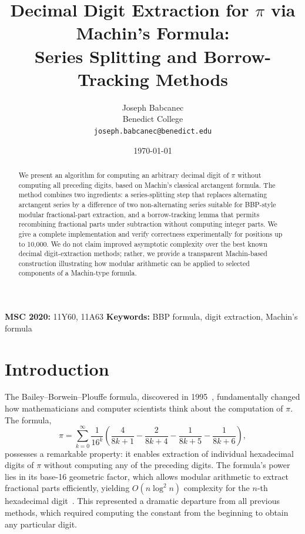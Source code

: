 \documentclass[11pt]{article}
\title{Decimal Digit Extraction for $\pi$ via Machin's Formula:\\Series Splitting and Borrow-Tracking Methods}
\author{Joseph Babcanec\\Benedict College\\\texttt{joseph.babcanec@benedict.edu}}
\date{\today}
\begin{document}
\maketitle

\begin{abstract}
We present an algorithm for computing an arbitrary decimal digit of $\pi$ without computing all preceding digits, based on Machin's classical arctangent formula. The method combines two ingredients: a series-splitting step that replaces alternating arctangent series by a difference of two non-alternating series suitable for BBP-style modular fractional-part extraction, and a borrow-tracking lemma that permits recombining fractional parts under subtraction without computing integer parts. We give a complete implementation and verify correctness experimentally for positions up to 10{,}000. We do not claim improved asymptotic complexity over the best known decimal digit-extraction methods; rather, we provide a transparent Machin-based construction illustrating how modular arithmetic can be applied to selected components of a Machin-type formula.
\end{abstract}

\noindent\textbf{MSC 2020:} 11Y60, 11A63 \hfill \textbf{Keywords:} BBP formula, digit extraction, Machin's formula

\section{Introduction}

The Bailey--Borwein--Plouffe formula, discovered in 1995~\cite{bbp1997}, fundamentally changed how mathematicians and computer scientists think about the computation of $\pi$. The formula,
\begin{equation}\label{eq:bbp}
\pi = \sum_{k=0}^{\infty} \frac{1}{16^k} \left( \frac{4}{8k+1} - \frac{2}{8k+4} - \frac{1}{8k+5} - \frac{1}{8k+6} \right),
\end{equation}
possesses a remarkable property: it enables extraction of individual hexadecimal digits of $\pi$ without computing any of the preceding digits. The formula's power lies in its base-16 geometric factor, which allows modular arithmetic to extract fractional parts efficiently, yielding $O(n \log^2 n)$ complexity for the $n$-th hexadecimal digit~\cite{bailey2006}. This represented a dramatic departure from all previous methods, which required computing the constant from the beginning to obtain any particular digit.
\end{document}
